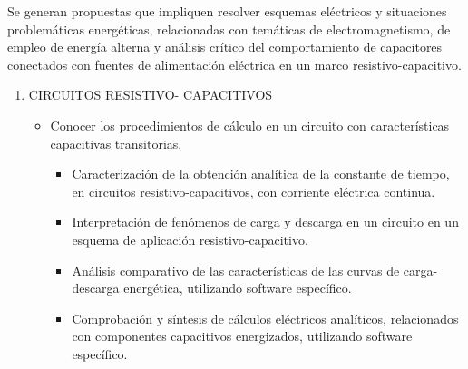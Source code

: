 \documentclass[planificacion2024.tex]{subfiles}
\begin{document}
Se generan propuestas que impliquen resolver esquemas 
eléctricos y situaciones problemáticas energéticas, relacionadas con temáticas de electromagnetismo, de empleo de energía alterna y análisis crítico del comportamiento de capacitores conectados con fuentes de alimentación eléctrica en un marco resistivo-capacitivo. 
\begin{enumerate}
    \item CIRCUITOS RESISTIVO- CAPACITIVOS 
    \begin{itemize}
        \item Conocer los procedimientos de cálculo en un circuito con características capacitivas transitorias.
        \begin{itemize}
            \item Caracterización de la obtención analítica de la constante de tiempo, en circuitos resistivo-capacitivos, con corriente eléctrica continua. 
            \item Interpretación de fenómenos de carga y descarga en un circuito en un esquema de aplicación resistivo-capacitivo. 
            \item Análisis comparativo de las características de las curvas de carga-descarga energética, utilizando software específico. 
            \item Comprobación y síntesis de cálculos eléctricos analíticos, relacionados con componentes capacitivos energizados, utilizando software específico. 
        \end{itemize}
        

\end{itemize}
\end{enumerate}
\end{document}
